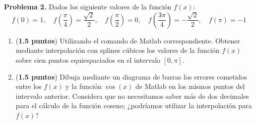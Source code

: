 \noindent \textbf{Problema 2.} Dados los siguiente valores de la función $f(x)$:
\begin{equation}
f(0) = 1, \quad f \left(\frac{\pi}{4}\right)= \frac{\sqrt{2}}{2}, \quad f \left(\frac{\pi}{2}\right) = 0, \quad f \left(\frac{3\pi}{4}\right) = -\frac{\sqrt{2}}{2}, \quad f(\pi) = -1 \nonumber
\end{equation}
\begin{enumerate}
\item (\textbf{1.5 puntos}) Utilizando el comando de Matlab correspondiente. Obtener mediante interpolación con splines cúbicos los valores de la función $f(x)$ sobre cien puntos equiespaciados en el intervalo $[0,\pi]$.

\item (\textbf{1.5 puntos}) Dibuja mediante un diagrama de barras los errores cometidos entre los $f(x)$ y la función $\cos(x)$ de Matlab en los mismos puntos del intervalo anterior. Considera que no necesitamos saber más de dos decimales para el cálculo de la función coseno; ¿podríamos utilizar la interpolación para $f(x)$?
\end{enumerate}



